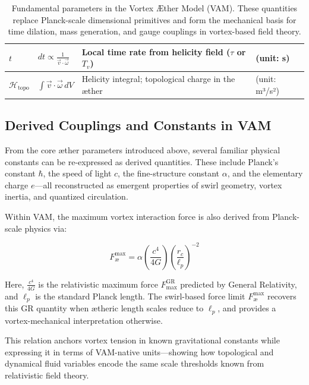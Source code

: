 \documentclass[12pt]{article}
\begin{document}
\begin{table}[H]
\begin{tabular}{|l|l|l|l|}
        $t$ &
        $dt \propto \frac{1}{\vec{v} \cdot \vec{\omega}}$ &
        Local time rate from helicity field ($\tau$ or $T_v$) &
        (unit: s) \\
        \hline

        $\mathcal{H}_\text{topo}$ &
        $\int \vec{v} \cdot \vec{\omega} \, dV$ &
        Helicity integral; topological charge in the æther &
        (unit: m³/s²) \\
        \hline
    \end{tabular}
    \caption{Fundamental parameters in the Vortex Æther Model (VAM). These quantities replace Planck-scale dimensional primitives and form the mechanical basis for time dilation, mass generation, and gauge couplings in vortex-based field theory.}
    \label{tab:VAM_master_table}
\end{table}

\subsection*{Derived Couplings and Constants in VAM}

From the core æther parameters introduced above, several familiar physical constants can be re-expressed as derived quantities. These include Planck’s constant $\hbar$, the speed of light $c$, the fine-structure constant $\alpha$, and the elementary charge $e$—all reconstructed as emergent properties of swirl geometry, vortex inertia, and quantized circulation.

Within VAM, the maximum vortex interaction force is also derived from Planck-scale physics via:

\begin{equation}
    F^{\text{max}}_{\text{\ae}} = \alpha \left(\frac{c^4}{4G}\right)  \left(\frac{r_c}{\ell_p}\right)^{-2}
    \label{eq:FmaxVAMfromGR}
\end{equation}

Here, $\frac{c^4}{4G}$ is the relativistic maximum force $F^{\text{GR}}_\text{max}$ predicted by General Relativity, and $\ell_p$ is the standard Planck length. The swirl-based force limit $F^{\text{max}}_{\text{\ae}}$ recovers this GR quantity when ætheric length scales reduce to $\ell_p$, and provides a vortex-mechanical interpretation otherwise.

This relation anchors vortex tension in known gravitational constants while expressing it in terms of VAM-native units—showing how topological and dynamical fluid variables encode the same scale thresholds known from relativistic field theory.
\end{document}
